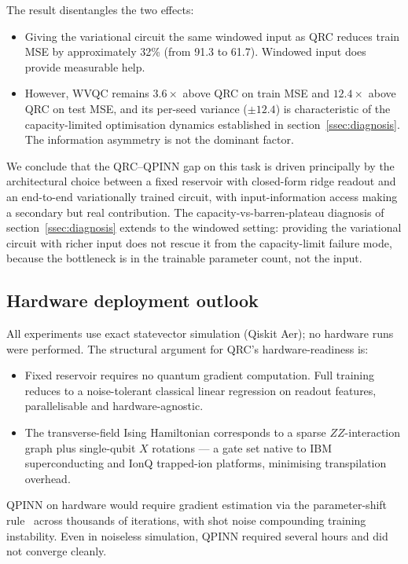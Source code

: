 \documentclass[a4paper,12pt]{iopart}
\begin{document}
The result disentangles the two effects:
\begin{itemize}
  \item Giving the variational circuit the same windowed input as QRC
        reduces train MSE by approximately 32\% (from 91.3 to 61.7).
        Windowed input does provide measurable help.
  \item However, WVQC remains $3.6\times$ above QRC on train MSE and
        $12.4\times$ above QRC on test MSE, and its per-seed variance
        ($\pm 12.4$) is characteristic of the capacity-limited
        optimisation dynamics established in
        section~\ref{ssec:diagnosis}. The information asymmetry is
        not the dominant factor.
\end{itemize}

We conclude that the QRC--QPINN gap on this task is driven principally
by the architectural choice between a fixed reservoir with closed-form
ridge readout and an end-to-end variationally trained circuit, with
input-information access making a secondary but real contribution.
The capacity-vs-barren-plateau diagnosis of
section~\ref{ssec:diagnosis} extends to the windowed setting:
providing the variational circuit with richer input does not rescue
it from the capacity-limit failure mode, because the bottleneck is in
the trainable parameter count, not the input.

\subsection{Hardware deployment outlook}

All experiments use exact statevector simulation (Qiskit Aer); no
hardware runs were performed. The structural argument for QRC's
hardware-readiness is:
\begin{itemize}
  \item Fixed reservoir requires no quantum gradient computation. Full
        training reduces to a noise-tolerant classical linear
        regression on readout features, parallelisable and
        hardware-agnostic.
  \item The transverse-field Ising Hamiltonian corresponds to a sparse
        $ZZ$-interaction graph plus single-qubit $X$ rotations --- a
        gate set native to IBM superconducting and IonQ trapped-ion
        platforms, minimising transpilation overhead.
\end{itemize}
QPINN on hardware would require gradient estimation via the
parameter-shift rule~\cite{mitarai2018quantum} across thousands of
iterations, with shot noise compounding training instability. Even in
noiseless simulation, QPINN required several hours and did not
converge cleanly.
\end{document}
